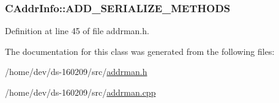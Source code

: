 \subsubsection[{A\+D\+D\+\_\+\+S\+E\+R\+I\+A\+L\+I\+Z\+E\+\_\+\+M\+E\+T\+H\+O\+D\+S}]{\setlength{\rightskip}{0pt plus 5cm}C\+Addr\+Info\+::\+A\+D\+D\+\_\+\+S\+E\+R\+I\+A\+L\+I\+Z\+E\+\_\+\+M\+E\+T\+H\+O\+D\+S}\label{class_c_addr_info_a9d5e0b95fa494171e4bffb900094fe2e}


Definition at line 45 of file addrman.\+h.



The documentation for this class was generated from the following files\+:\begin{DoxyCompactItemize}
\item 
/home/dev/ds-\/160209/src/\hyperlink{addrman_8h}{addrman.\+h}\item 
/home/dev/ds-\/160209/src/\hyperlink{addrman_8cpp}{addrman.\+cpp}\end{DoxyCompactItemize}
